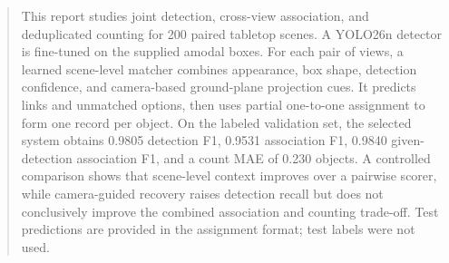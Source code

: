 \begin{abstract}
This report studies joint detection, cross-view association, and deduplicated counting for 200 paired tabletop scenes. A YOLO26n detector is fine-tuned on the supplied amodal boxes. For each pair of views, a learned scene-level matcher combines appearance, box shape, detection confidence, and camera-based ground-plane projection cues. It predicts links and unmatched options, then uses partial one-to-one assignment to form one record per object. On the labeled validation set, the selected system obtains 0.9805 detection F1, 0.9531 association F1, 0.9840 given-detection association F1, and a count MAE of 0.230 objects. A controlled comparison shows that scene-level context improves over a pairwise scorer, while camera-guided recovery raises detection recall but does not conclusively improve the combined association and counting trade-off. Test predictions are provided in the assignment format; test labels were not used.
\end{abstract}
